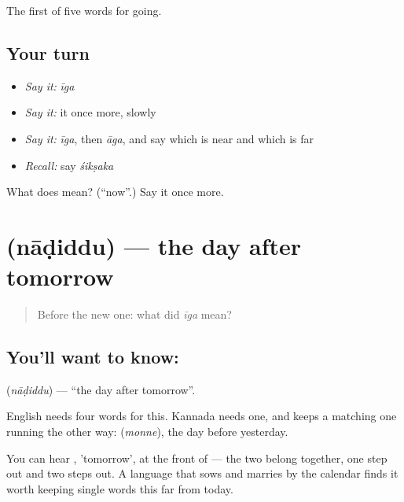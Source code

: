 \begin{grammarlens}[title={What you've built}]
The first of five words for going.
\end{grammarlens}

\subsection*{Your turn}
\begin{itemize}
\raggedright
  \item \emph{Say it:} \emph{īga}
  \item \emph{Say it:} it once more, slowly
  \item \emph{Say it:} \emph{īga}, then \emph{āga}, and say which is near and which is far
  \item \emph{Recall:} say \emph{śikṣaka}
\end{itemize}

\begin{tcolorbox}[breakable,colback=teal!4,colframe=teal!35!black,title={Before you move on}]
What does  mean? (\textquotedblleft{}now\textquotedblright{}.) Say it once more.
\end{tcolorbox}
\section[\texorpdfstring{\kn{ನಾಡಿದ್ದು} (nāḍiddu)}{ನಾಡಿದ್ದು (nāḍiddu)}]{ (nāḍiddu) — the day after tomorrow}

\label{lesson:KA-C50-day-after}



\begin{quote}
Before the new one: what did \emph{īga} mean?
\end{quote}

\subsection*{You'll want to know: }
\textbf{} (\emph{nāḍiddu}) — \textquotedblleft{}the day after tomorrow\textquotedblright{}.

English needs four words for this. Kannada needs one, and keeps a matching one running the other way:  (\emph{monne}), the day before yesterday.

You can hear , 'tomorrow', at the front of  — the two belong together, one step out and two steps out. A language that sows and marries by the calendar finds it worth keeping single words this far from today.

